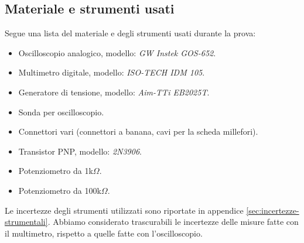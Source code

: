   \subsection{Materiale e strumenti usati}\label{subsec:materiali}
  Segue una lista del materiale e degli strumenti usati durante la prova:
  \begin{itemize}
    \item%
    Oscilloscopio analogico, modello: \emph{GW Instek GOS-652}.
    \item%
    Multimetro digitale, modello: \emph{ISO-TECH IDM 105}.
    \item%
    Generatore di tensione, modello: \emph{Aim-TTi EB2025T}.
    \item%
    Sonda per oscilloscopio.
    \item%
    Connettori vari (connettori a banana, cavi per la scheda millefori).
    \item%
    Transistor PNP, modello: \emph{2N3906}.
    \item
    Potenziometro da 1k$\Omega$.
    \item
    Potenziometro da 100k$\Omega$.
  \end{itemize}
  Le incertezze degli strumenti utilizzati sono riportate in appendice \ref{sec:incertezze-strumentali}.
  Abbiamo considerato trascurabili le incertezze delle misure fatte con il multimetro, rispetto a quelle fatte con l'oscilloscopio.
